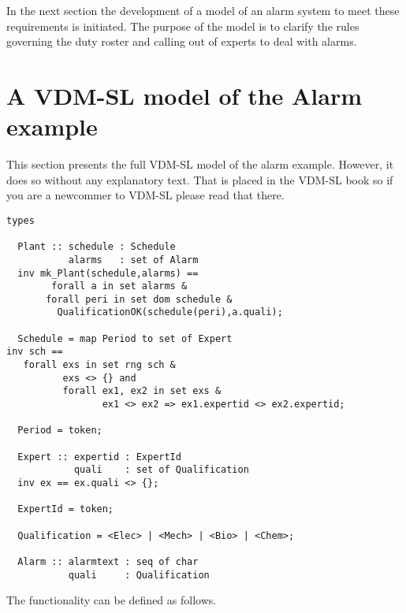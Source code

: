 In the next section the development of a model of an alarm
system to meet these requirements is initiated. The purpose of the model is to
clarify the rules governing the duty roster and calling out of experts
to deal with alarms.

\section{A VDM-SL model of the Alarm example}

This section presents the full VDM-SL model
of the alarm example. However, it does so without any explanatory
text. That is placed in the VDM-SL book so if you are a newcommer to
VDM-SL please read that there.

\begin{lstlisting}
types

  Plant :: schedule : Schedule
           alarms   : set of Alarm
  inv mk_Plant(schedule,alarms) ==
        forall a in set alarms &
	   forall peri in set dom schedule &
	     QualificationOK(schedule(peri),a.quali);
	     
  Schedule = map Period to set of Expert
inv sch ==
   forall exs in set rng sch &
          exs <> {} and
          forall ex1, ex2 in set exs &
                 ex1 <> ex2 => ex1.expertid <> ex2.expertid;

  Period = token;

  Expert :: expertid : ExpertId
            quali    : set of Qualification
  inv ex == ex.quali <> {};

  ExpertId = token;

  Qualification = <Elec> | <Mech> | <Bio> | <Chem>;
	   
  Alarm :: alarmtext : seq of char
           quali     : Qualification
\end{lstlisting}

The functionality can be defined as follows.

